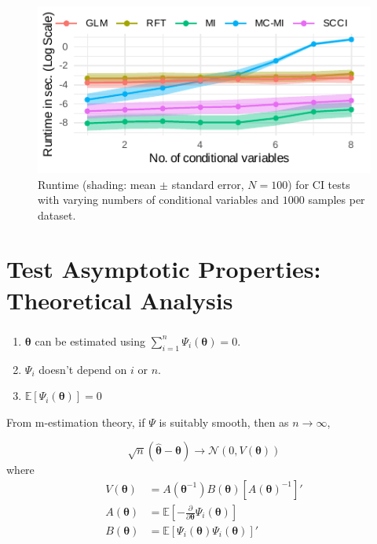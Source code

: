 \documentclass{beamer}
\begin{document}
\begin{frame}
	\frametitle{}
	\begin{figure}
		\centering
		\includegraphics{imgs/runtime.pdf}
		\caption*{Runtime (shading: mean $\pm$ standard error, $N=100$)
		for CI tests with varying numbers of conditional variables and
		$1000$ samples per dataset.
		}
	\end{figure}
\end{frame}

\section{Test Asymptotic Properties: Theoretical Analysis}
\begin{frame}
	\frametitle{}
	\begin{enumerate}
		\item $ \bm{\theta} $ can be estimated using $ \sum_{i=1}^n \Psi_i(\bm{\theta}) = 0 $.
		\item $ \Psi_i $ doesn't depend on $ i $ or $ n $.
		\item $ \mathbb{E}[\Psi_i(\bm{\theta})] = 0 $
	\end{enumerate}

	From m-estimation theory, if $ \Psi $ is suitably smooth, then as $ n \to \infty $,

	$$ \sqrt{n}(\hat{\bm{\theta}} - \bm{\theta}) \to \mathcal{N}(0, V(\bm{\theta})) $$
	where 
	\begin{equation*}
		\begin{split}
			V(\bm{\theta}) &= A(\bm{\theta}^{-1}) B(\bm{\theta})[A(\bm{\theta})^{-1}]' \\
			A(\bm{\theta}) &= \mathbb{E} \left[ - \frac{\partial}{\partial \bm{\theta}} \Psi_i(\bm{\theta}) \right] \\ 
			B(\bm{\theta}) &= \mathbb{E}[\Psi_i(\bm{\theta}) \Psi_i(\bm{\theta})]'
		\end{split}
	\end{equation*}

\end{frame}
\end{document}
